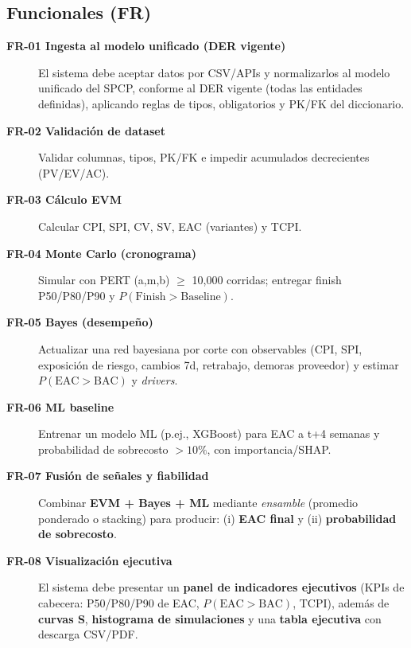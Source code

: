 \documentclass[12pt]
{charter}
\begin{document}
\subsection{Funcionales (FR)}
\begin{description}
  \item[\textbf{FR-01 Ingesta al modelo unificado (DER vigente)}] El sistema debe aceptar datos por CSV/APIs y normalizarlos al modelo unificado del SPCP, conforme al DER vigente (todas las entidades definidas), aplicando reglas de tipos, obligatorios y PK/FK del diccionario.

  \item[\textbf{FR-02 Validación de dataset}] Validar columnas, tipos, PK/FK e impedir acumulados decrecientes (PV/EV/AC).

  \item[\textbf{FR-03 Cálculo EVM}] Calcular CPI, SPI, CV, SV, EAC (variantes) y TCPI.

  \item[\textbf{FR-04 Monte Carlo (cronograma)}] Simular con PERT (a,m,b) $\geq$ 10{,}000 corridas; entregar finish P50/P80/P90 y $P(\text{Finish}>\text{Baseline})$.

  \item[\textbf{FR-05 Bayes (desempeño)}] Actualizar una red bayesiana por corte con observables (CPI, SPI, exposición de riesgo, cambios 7d, retrabajo, demoras proveedor) y estimar $P(\text{EAC}>\text{BAC})$ y \textit{drivers}.

  \item[\textbf{FR-06 ML baseline}] Entrenar un modelo ML (p.ej., XGBoost) para EAC a t+4 semanas y probabilidad de sobrecosto $>10\%$, con importancia/SHAP.

  \item[\textbf{FR-07 Fusión de señales y fiabilidad}] Combinar \textbf{EVM + Bayes + ML} mediante \textit{ensamble} (promedio ponderado o stacking) para producir: (i) \textbf{EAC final} y (ii) \textbf{probabilidad de sobrecosto}. 

  \item[\textbf{FR-08 Visualización ejecutiva}] El sistema debe presentar un \textbf{panel de indicadores ejecutivos} (KPIs de cabecera: P50/P80/P90 de EAC, $P(\text{EAC}>\text{BAC})$, TCPI), además de \textbf{curvas S}, \textbf{histograma de simulaciones} y una \textbf{tabla ejecutiva} con descarga CSV/PDF.


\end{description}
\end{document}
